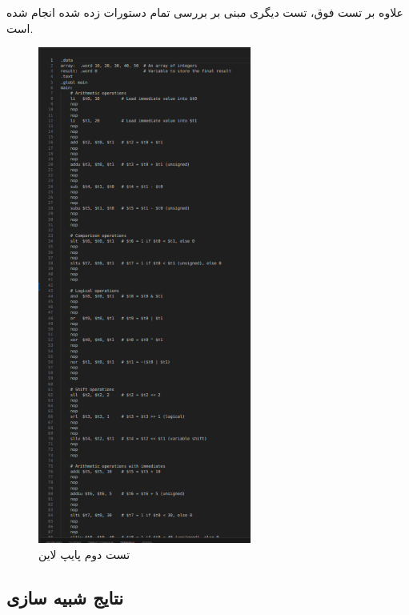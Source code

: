 \documentclass[11pt, a4paper]{article}
\begin{document}
	
	علاوه بر تست فوق، تست دیگری مبنی بر بررسی تمام دستورات زده شده انجام شده است.
	
	\begin{figure}[H]
		\begin{center}
			\includegraphics[width=7cm]{Photos/11.png}
		\end{center}
		\caption{تست دوم پایپ لاین}
		\label{mips2_pipeline}
	\end{figure}
	
	
	
	\subsection{نتایج شبیه سازی}
	
\end{document}
